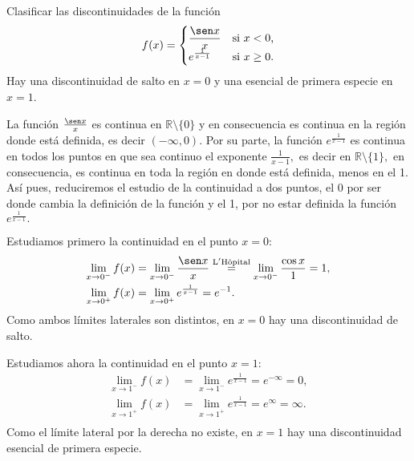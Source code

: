 {Clasificar las discontinuidades de la función
\[
f(x)=
\begin{cases}
\dfrac{\sen x}{x} & \text{si $x<0$,} \\ 
e^{\frac{1}{x-1}} & \text{si $x\geq 0$.}
\end{cases}
\]
}
{Hay una discontinuidad de salto en $x=0$ y una esencial de primera especie en $x=1$.
}
{La función $\frac{\sen x}{x}$ es continua en $\mathbb{R}\setminus{\{0\}}$ y en consecuencia es continua en la región donde está definida, es decir $(-\infty ,0)$. Por su parte, la función $e^{\frac 1{x-1}}$ es continua en todos los puntos en que sea continuo el exponente $\frac{1}{x-1},$ es decir en $\mathbb{R}\setminus{\{1\}},$ en consecuencia, es continua en toda la región en donde está definida, menos en el 1. Así pues, reduciremos el estudio de la continuidad a dos puntos, el 0 por ser donde cambia la definición de la función y el 1, por no estar definida la función $e^{\frac{1}{x-1}}.$

Estudiamos primero la continuidad en el punto $x=0$:
\begin{align*}
\lim_{x\rightarrow 0^{-}}f(x) &= \lim_{x\rightarrow 0^{-}}\frac{\sen x}{x}\stackrel{\text{L}^{\prime }\text{H\^{o}pital}}{=} \lim_{x\rightarrow 0^{-}}\frac{\cos x}{1} = 1,\\
\lim_{x\rightarrow 0^{+}}f(x) &= \lim_{x\rightarrow 0^{+}}e^{\frac{1}{x-1}} = e^{-1}.\\
\end{align*}
Como ambos límites laterales son distintos, en $x=0$ hay una discontinuidad de salto.

Estudiamos ahora la continuidad en el punto $x=1$:
\begin{align*}
\lim_{x\rightarrow 1^{-}}f(x) &= \lim_{x\rightarrow 1^{-}}e^{\frac{1}{x-1}}=e^{-\infty }=0, \\
\lim_{x\rightarrow 1^{+}}f(x) &= \lim_{x\rightarrow 1^{+}}e^{\frac{1}{x-1}}=e^\infty = \infty.\\ 
\end{align*}
Como el límite lateral por la derecha no existe, en $x=1$ hay una discontinuidad esencial de primera especie.
}



